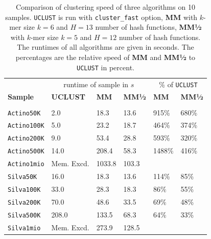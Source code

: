 \documentclass[../../main.tex]{subfiles}
\begin{document}
\begin{table}[H]
\centering
\begin{tabular}{l l l l l l }
\hline
 & \multicolumn{3}{c}{runtime of sample in $s$} & \multicolumn{2}{c}{\% of {\tt UCLUST}}\\
\textbf{Sample} & \textbf{UCLUST} & \textbf{MM} & \textbf{MM½} & \textbf{MM} & \textbf{MM½}\\
\hline \\
\texttt{Actino50K} & 2.0 & 18.3 & 13.6 & 915\% & 680\%\\
\texttt{Actino100K} & 5.0 & 23.2 & 18.7 & 464\% & 374\% \\
\texttt{Actino200K} & 9.0 & 53.4 & 28.8 & 593\% & 320\%\\
\texttt{Actino500K} & 14.0 & 208.4 & 58.3 & 1488\% & 416\% \\
\texttt{Actino1mio} & Mem. Excd. & 1033.8 & 103.3 & & \\
\texttt{Silva50K} & 16.0 & 18.3 & 13.6 & 114\% & 85\% \\
\texttt{Silva100K} & 33.0 & 28.3 & 18.3 & 86\% & 55\%\\
\texttt{Silva200K} & 70.0 & 48.6 & 33.5 & 69\% & 48\% \\
\texttt{Silva500K} & 208.0 & 133.5 & 68.3 & 64\% & 33\%\\
\texttt{Silva1mio} & Mem. Excd. & 273.9 & 128.5 & & \\
\hline
\end{tabular}
\caption{Comparison of clustering speed of three algorithms on 10 samples. \texttt{UCLUST} is run with \texttt{cluster\_fast} option, {\bf MM} with $k$-mer size $k=6$ and $H=13$ number of hash functions, {\bf MM½} with $k$-mer size $k=5$ and $H=12$ number of hash functions. The runtimes of all algorithms are given in seconds. The percentages are the relative speed of {\bf MM} and {\bf MM½} to {\tt UCLUST} in percent.}\label{tab:speedtest}
\end{table}
\end{document}
